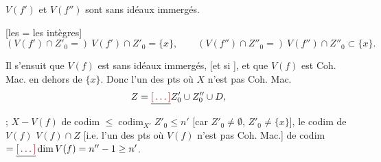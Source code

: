 \documentclass[11pt,a4paper]{article}
\begin{document}
$V(f')$ et $V(f'')$ sont sans idéaux immergés.

[les  = les  intègres]
\[
  (V(f') \cap Z'_0 =)\ V(f') \cap Z'_0 = \{x\} , \qquad
  (V(f'') \cap Z''_0 =)\ V(f'') \cap Z''_0 \subset \{x\} .
\]

Il s'ensuit que $V(f)$ est sans idéaux immergés, [et \ill{} \ill{} si \ill{}
\ill{}], et que $V(f)$ est Coh. Mac. en dehors de $\{x\}$.  Donc l'un des pts où $X$ n'est pas Coh. Mac. 
\[
  Z = \struck{\ill{}} Z'_0 \cup Z''_0 \cup D ,
\]
  \ill{} ; $X - V(f)$  de codim
$\leq \operatorname{codim}_{X'} Z'_0 \leq n'$ \ill{} [car $Z'_0 \neq
\emptyset$, $Z'_0 \neq \{x\}$],  
 le codim de $V(f)$  $V(f) \cap Z$ [i.e. l'un des
pts où $V(f)$ n'est \struck{\ill{}}   pas Coh.
Mac.]  de codim $= \struck{\ill{}} \dim V(f) = n'' - 1 \geq
n'$.

\end{document}
